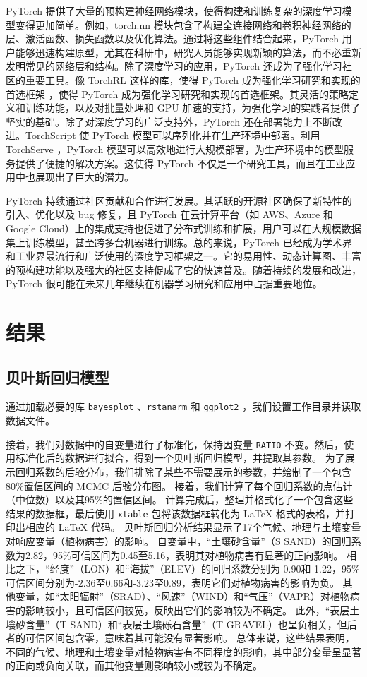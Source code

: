 \documentclass[AutoFakeBold]{LZUThesis-PgD&PhD}
\begin{document}
	PyTorch 提供了大量的预构建神经网络模块，使得构建和训练复杂的深度学习模型变得更加简单。例如，torch.nn 模块包含了构建全连接网络和卷积神经网络的层、激活函数、损失函数以及优化算法。通过将这些组件结合起来，PyTorch 用户能够迅速构建原型，尤其在科研中，研究人员能够实现新颖的算法，而不必重新发明常见的网络层和结构。除了深度学习的应用，PyTorch 还成为了强化学习社区的重要工具。像 TorchRL 这样的库，使得 PyTorch 成为强化学习研究和实现的首选框架 \cite{torchrl}，使得 PyTorch 成为强化学习研究和实现的首选框架。其灵活的策略定义和训练功能，以及对批量处理和 GPU 加速的支持，为强化学习的实践者提供了坚实的基础。除了对深度学习的广泛支持外，PyTorch 还在部署能力上不断改进。TorchScript \cite{torchscript} 使 PyTorch 模型可以序列化并在生产环境中部署。利用 TorchServe \cite{torchserve}，PyTorch 模型可以高效地进行大规模部署，为生产环境中的模型服务提供了便捷的解决方案。这使得 PyTorch 不仅是一个研究工具，而且在工业应用中也展现出了巨大的潜力。
	
	PyTorch 持续通过社区贡献和合作进行发展。其活跃的开源社区确保了新特性的引入、优化以及 bug 修复，且 PyTorch 在云计算平台（如 AWS、Azure 和 Google Cloud）上的集成支持也促进了分布式训练和扩展，用户可以在大规模数据集上训练模型，甚至跨多台机器进行训练。总的来说，PyTorch 已经成为学术界和工业界最流行和广泛使用的深度学习框架之一。它的易用性、动态计算图、丰富的预构建功能以及强大的社区支持促成了它的快速普及。随着持续的发展和改进，PyTorch 很可能在未来几年继续在机器学习研究和应用中占据重要地位。
	
	\chapter{结果}
	
	\section{贝叶斯回归模型}
	通过加载必要的库 \texttt{bayesplot} \cite{bayesplot2018}、\texttt{rstanarm} \cite{rstanarm2018} 和 \texttt{ggplot2} \cite{ggplot2}，我们设置工作目录并读取数据文件。

	接着，我们对数据中的自变量进行了标准化，保持因变量 \texttt{RATIO} 不变。然后，使用标准化后的数据进行拟合，得到一个贝叶斯回归模型，并提取其参数。
	为了展示回归系数的后验分布，我们排除了某些不需要展示的参数，并绘制了一个包含80\%置信区间的 MCMC 后验分布图。
	接着，我们计算了每个回归系数的点估计（中位数）以及其95\%的置信区间。
	计算完成后，整理并格式化了一个包含这些结果的数据框，最后使用 \texttt{xtable} 包将该数据框转化为 LaTeX 格式的表格，并打印出相应的 LaTeX 代码。
	贝叶斯回归分析结果显示了17个气候、地理与土壤变量对响应变量（植物病害）的影响。
	自变量中，“土壤砂含量”（S SAND）的回归系数为2.82，95\%可信区间为0.45至5.16，表明其对植物病害有显著的正向影响。
	相比之下，“经度”（LON）和“海拔”（ELEV）的回归系数分别为-0.90和-1.22，95\%可信区间分别为-2.36至0.66和-3.23至0.89，表明它们对植物病害的影响为负。
	其他变量，如“太阳辐射”（SRAD）、“风速”（WIND）和“气压”（VAPR）对植物病害的影响较小，且可信区间较宽，反映出它们的影响较为不确定。
	此外，“表层土壤砂含量”（T SAND）和“表层土壤砾石含量”（T GRAVEL）也呈负相关，但后者的可信区间包含零，意味着其可能没有显著影响。
	总体来说，这些结果表明，不同的气候、地理和土壤变量对植物病害有不同程度的影响，其中部分变量呈显著的正向或负向关联，而其他变量则影响较小或较为不确定。
	
\end{document}
